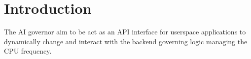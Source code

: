 \hypertarget{index_intro_sec}{}\section{Introduction}\label{index_intro_sec}
The AI governor aim to be act as an A\+PI interface for userspace applications to dynamically change and interact with the backend governing logic managing the C\+PU frequency. 